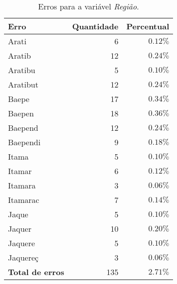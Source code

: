 \documentclass[10pt,a4paper,oneside]{article}
\begin{document}
\begin{table}[!h]
\centering
\caption{Erros para a variável \textit{Região}.}
\vspace{0.5em}
\label{table: erros-regiao}
\begin{tabular}{l r r}
	\toprule
	\textbf{Erro} & \textbf{Quantidade}  & \textbf{Percentual} \\
	\midrule
	Arati      & 6  & $0.12\%$ \\
	Aratib     & 12 & $0.24\%$ \\
	Aratibu    & 5  & $0.10\%$ \\
	Aratibut   & 12 & $0.24\%$ \\
	Baepe      & 17 & $0.34\%$ \\
	Baepen     & 18 & $0.36\%$ \\
	Baepend    & 12 & $0.24\%$ \\
	Baependi   & 9  & $0.18\%$ \\
	Itama      & 5  & $0.10\%$ \\
	Itamar     & 6  & $0.12\%$ \\
	Itamara    & 3  & $0.06\%$ \\
	Itamarac   & 7  & $0.14\%$ \\
	Jaque      & 5  & $0.10\%$ \\
	Jaquer     & 10 & $0.20\%$ \\
	Jaquere    & 5  & $0.10\%$ \\
	Jaquereç   & 3  & $0.06\%$ \\
	\midrule
	\textbf{Total de erros}  & 135  & $2.71\%$ \\	
	\bottomrule
\end{tabular}
\end{table}
\end{document}
